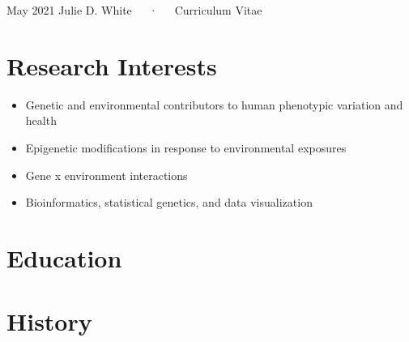 \documentclass[11pt, a4paper]{awesome-cv}
\providecommand{\tightlist}{%
	\setlength{\itemsep}{0pt}\setlength{\parskip}{0pt}}
\begin{document}
\makecvheader

\makecvfooter
  {May 2021}
    {Julie D. White~~~·~~~Curriculum Vitae}
  {\thepage}





\hypertarget{research-interests}{%
\section{Research Interests}\label{research-interests}}

\begin{itemize}
\tightlist
\item
  Genetic and environmental contributors to human phenotypic variation
  and health
\item
  Epigenetic modifications in response to environmental exposures
\item
  Gene x environment interactions
\item
  Bioinformatics, statistical genetics, and data visualization
\end{itemize}

\hypertarget{education}{%
\section{Education}\label{education}}

\begin{cventries}
    \vspace{-4.0mm}
    \vspace{-4.0mm}
    \vspace{-4.0mm}
\end{cventries}

\hypertarget{history}{%
\section{History}\label{history}}
\end{document}

